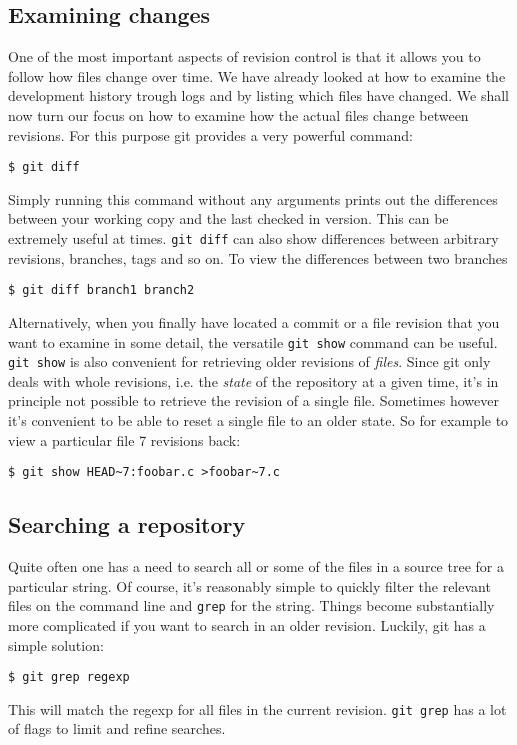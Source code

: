 \documentclass[a4paper,10pt]{article}
\begin{document}
\subsection{Examining changes}
One of the most important aspects of revision control is that it allows you to
follow how files change over time. We have already looked at how to examine
the development history trough logs and by listing which files have changed.
We shall now turn our focus on how to examine how the actual files change
between revisions. For this purpose git provides a very powerful command:
\begin{verbatim}
$ git diff
\end{verbatim}
Simply running this command without any arguments prints out the differences
between your working copy and the last checked in version. This can be
extremely useful at times. \texttt{git diff} can also show differences between
arbitrary revisions, branches, tags and so on. To view the differences
between two branches
\begin{verbatim}
$ git diff branch1 branch2
\end{verbatim}

Alternatively, when you finally have located a commit or a file revision that
you want to examine in some detail, the versatile \texttt{git show} command
can be useful.  \texttt{git show} is also convenient for retrieving older
revisions of \emph{files}. Since git only deals with whole revisions, i.e. the
\emph{state} of the repository at a given time, it's in principle not possible
to retrieve the revision of a single file. Sometimes however it's convenient
to be able to reset a single file to an older state.  So for example to view a
particular file 7 revisions back:
\begin{verbatim}
$ git show HEAD~7:foobar.c >foobar~7.c
\end{verbatim}

\subsection{Searching a repository}
Quite often one has a need to search all or some of the files in a source
tree for a particular string. Of course, it's reasonably simple to quickly
filter the relevant files on the command line and \texttt{grep} for the
string. Things become substantially more complicated if you want to search in 
an older revision. Luckily, git has a simple solution:
\begin{verbatim}
$ git grep regexp 
\end{verbatim}
This will match the regexp for all files in the current revision.
\texttt{git grep} has a lot of flags to limit and refine searches.
\end{document}
